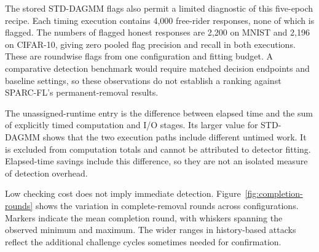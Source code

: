 \documentclass[journal]{IEEEtran}
\begin{document}
The stored STD-DAGMM flags also permit a limited diagnostic of this
five-epoch recipe. Each timing execution contains 4,000 free-rider
responses, none of which is flagged. The numbers of flagged honest
responses are 2,200 on MNIST and 2,196 on CIFAR-10, giving zero pooled
flag precision and recall in both executions. These are roundwise flags
from one configuration and fitting budget. A comparative detection
benchmark would require matched decision endpoints and baseline settings,
so these observations do not establish a ranking against SPARC-FL's
permanent-removal results.

The unassigned-runtime entry is the difference between elapsed time and
the sum of explicitly timed computation and I/O stages. Its larger value
for STD-DAGMM shows that the two execution paths include different
untimed work. It is excluded from computation totals and cannot be
attributed to detector fitting. Elapsed-time savings include this
difference, so they are not an isolated measure of detection overhead.

Low checking cost does not imply immediate detection.
Figure~\ref{fig:completion-rounds} shows the variation in complete-removal
rounds across configurations. Markers indicate the mean completion round,
with whiskers spanning the observed minimum and maximum.
The wider ranges in history-based attacks
reflect the additional challenge cycles sometimes needed for confirmation.
\end{document}
